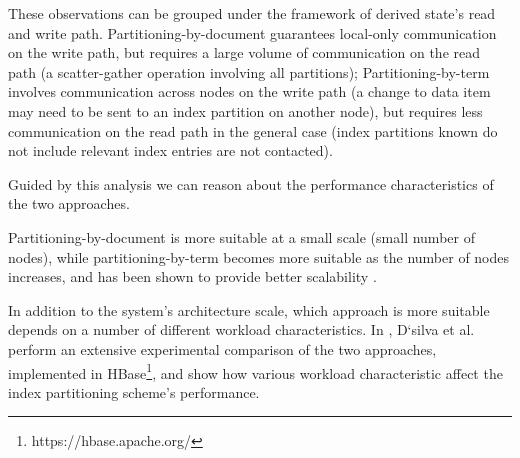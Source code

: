 These observations can be grouped under the framework of derived state's read and write path.
Partitioning-by-document guarantees local-only communication on the write path, but requires a large volume of
communication on the read path (a scatter-gather operation involving all partitions);
Partitioning-by-term involves communication across nodes on the write path (a change to data item may need to be sent to
an index partition on another node),
but requires less communication on the read path in the general case
(index partitions known do not include relevant index entries are not contacted).


Guided by this analysis we can reason about the performance characteristics of the two approaches.

Partitioning-by-document is more suitable at a small scale (small number of nodes),
while partitioning-by-term becomes more suitable as the number of nodes increases,
and has been shown to provide better scalability \cite{kejriwal:slik}.

In addition to the system's architecture scale,
which approach is more suitable depends on a number of different workload characteristics.
In \cite{dsilva:tworings}, D`silva et al. perform an extensive experimental comparison of the two approaches,
implemented in HBase\footnote{https://hbase.apache.org/}, and show how various workload characteristic affect the index partitioning scheme's performance.

